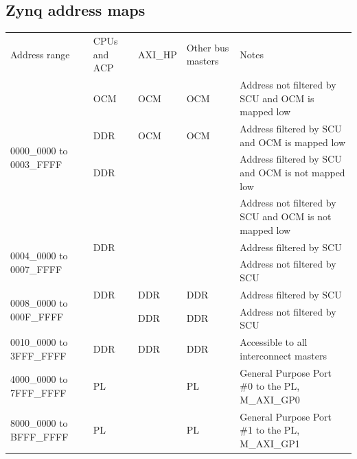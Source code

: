 \begin{appendices}
\chapter{Zynq address maps}
\begin{table}
\centering
\begin{tabular}{lllll}
Address range                             & CPUs and ACP & AXI\_HP & Other bus masters & Notes                                                 \\
\multirow{4}{*}{0000\_0000 to 0003\_FFFF} & OCM          & OCM     & OCM               & Address not filtered by SCU and OCM is mapped low     \\
                                          & DDR          & OCM     & OCM               & Address filtered by SCU and OCM is mapped low         \\
                                          & DDR          &         &                   & Address filtered by SCU and OCM is not mapped low     \\
                                          &              &         &                   & Address not filtered by SCU and OCM is not mapped low \\
\multirow{2}{*}{0004\_0000 to 0007\_FFFF} & DDR          &         &                   & Address filtered by SCU                               \\
                                          &              &         &                   & Address not filtered by SCU                           \\
\multirow{2}{*}{0008\_0000 to 000F\_FFFF} & DDR          & DDR     & DDR               & Address filtered by SCU                               \\
                                          &              & DDR     & DDR               & Address not filtered by SCU                           \\
0010\_0000 to 3FFF\_FFFF                  & DDR          & DDR     & DDR               & Accessible to all interconnect masters                \\
4000\_0000 to 7FFF\_FFFF                  & PL           &         & PL                & General Purpose Port \#0 to the PL, M\_AXI\_GP0       \\
8000\_0000 to BFFF\_FFFF                  & PL           &         & PL                & General Purpose Port \#1 to the PL, M\_AXI\_GP1       \\

\end{tabular}
\end{table}
\end{appendices}
